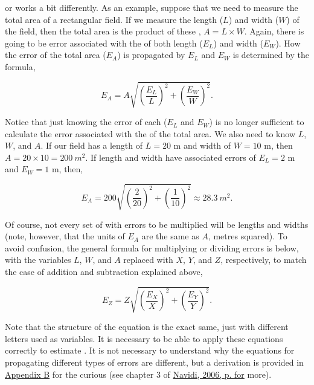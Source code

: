 \documentclass[
  openany]{krantz}
\begin{document}
 or   works a bit differently.
As an example, suppose that we need to measure the total area of a rectangular field.
If we measure the length (\(L\)) and width (\(W\)) of the field, then the total area is the product of these , \(A = L \times W\).
Again, there is going to be error associated with the  of both length (\(E_{L}\)) and width (\(E_{W}\)).
How the error of the total area (\(E_{A}\)) is propagated by \(E_{L}\) and \(E_{W}\) is determined by the formula,

\[E_{A} = A \sqrt{\left(\frac{E_{L}}{L} \right)^{2} + \left(\frac{E_{W}}{W} \right)^{2}}.\]

Notice that just knowing the error of each  (\(E_{L}\) and \(E_{W}\)) is no longer sufficient to calculate the error associated with the  of the total area.
We also need to know \(L\), \(W\), and \(A\).
If our field has a length of \(L = 20\) m and width of \(W = 10\) m, then \(A = 20 \times 10 = 200\:m^{2}\).
If length and width  have associated errors of \(E_{L} = 2\) m and \(E_{W} = 1\) m, then,

\[E_{A} = 200 \sqrt{\left(\frac{2}{20} \right)^{2} + \left(\frac{1}{10} \right)^{2}} \approx 28.3\:m^{2}.\]

Of course, not every set of  with errors to be multiplied will be lengths and widths (note, however, that the units of \(E_{A}\) are the same as \(A\), metres squared).
To avoid confusion, the general formula for multiplying or dividing errors is below, with the variables \(L\), \(W\), and \(A\) replaced with \(X\), \(Y\), and \(Z\), respectively, to match the case of addition and subtraction explained above,

\[E_{Z} = Z \sqrt{\left(\frac{E_{X}}{X} \right)^{2} + \left(\frac{E_{Y}}{Y} \right)^{2}}.\]

Note that the structure of the equation is the exact same, just with different letters used as variables.
It is necessary to be able to apply these equations correctly to estimate .
It is not necessary to understand why the equations for propagating different types of errors are different, but a derivation is provided in \protect\hyperlink{uncertainty_derivation}{Appendix B} for the curious (see chapter 3 of \protect\hyperlink{ref-Navidi2006}{Navidi, 2006, p. for} more).
\end{document}
